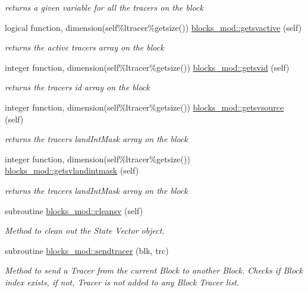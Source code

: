 \begin{DoxyCompactItemize}
\begin{DoxyCompactList}\small\item\em returns a given variable for all the tracers on the block \end{DoxyCompactList}\item 
logical function, dimension(self\%ltracer\%getsize()) \mbox{\hyperlink{namespaceblocks__mod_a2fdac72f343c10f38d1acb3f5779de18}{blocks\+\_\+mod\+::getsvactive}} (self)
\begin{DoxyCompactList}\small\item\em returns the active tracers array on the block \end{DoxyCompactList}\item 
integer function, dimension(self\%ltracer\%getsize()) \mbox{\hyperlink{namespaceblocks__mod_af9cfa830fff1b8986efba72fa4c82473}{blocks\+\_\+mod\+::getsvid}} (self)
\begin{DoxyCompactList}\small\item\em returns the tracers id array on the block \end{DoxyCompactList}\item 
integer function, dimension(self\%ltracer\%getsize()) \mbox{\hyperlink{namespaceblocks__mod_abd5099df59aeafdc3b318719dd4c8d20}{blocks\+\_\+mod\+::getsvsource}} (self)
\begin{DoxyCompactList}\small\item\em returns the tracers land\+Int\+Mask array on the block \end{DoxyCompactList}\item 
integer function, dimension(self\%ltracer\%getsize()) \mbox{\hyperlink{namespaceblocks__mod_a046c07d2d955655055d78e37b6e622ef}{blocks\+\_\+mod\+::getsvlandintmask}} (self)
\begin{DoxyCompactList}\small\item\em returns the tracers land\+Int\+Mask array on the block \end{DoxyCompactList}\item 
subroutine \mbox{\hyperlink{namespaceblocks__mod_ab70bfe5cdce5a717115cfbac04f606a0}{blocks\+\_\+mod\+::cleansv}} (self)
\begin{DoxyCompactList}\small\item\em Method to clean out the State Vector object. \end{DoxyCompactList}\item 
subroutine \mbox{\hyperlink{namespaceblocks__mod_a5a9992de40470e417ec8e40e688f6a0e}{blocks\+\_\+mod\+::sendtracer}} (blk, trc)
\begin{DoxyCompactList}\small\item\em Method to send a Tracer from the current Block to another Block. Checks if Block index exists, if not, Tracer is not added to any Block Tracer list. \end{DoxyCompactList}\item 

\end{DoxyCompactItemize}
